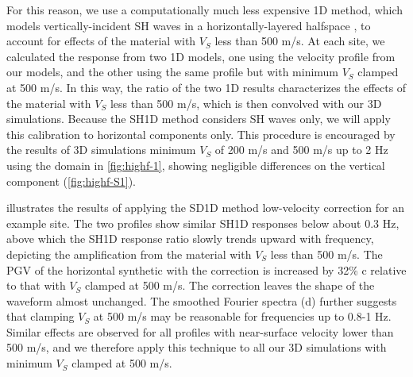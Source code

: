 For this reason, we use a computationally much less expensive 1D method, which models vertically-incident SH waves in a horizontally-layered halfspace , to account for effects of the material with $V_S$ less than 500 m/s. At each site, we calculated the response from two 1D models, one using the velocity profile from our models, and the other using the same profile but with minimum $V_S$ clamped at 500 m/s. In this way, the ratio of the two 1D results characterizes the effects of the material with $V_S$ less than 500 m/s, which is then convolved with our 3D simulations. Because the SH1D method considers SH waves only, we will apply this calibration to horizontal components only. This procedure is encouraged by the results of 3D simulations minimum $V_S$ of 200 m/s and 500 m/s up to 2 Hz using the domain in \cref{fig:highf-1}, showing negligible differences on the vertical component (\cref{fig:highf-S1}).

 illustrates the results of applying the SD1D method low-velocity correction for an example site. The two profiles show similar SH1D responses below about 0.3 Hz, above which the SH1D response ratio slowly trends upward with frequency, depicting the amplification from the material with $V_S$ less than 500 m/s. The PGV of the horizontal synthetic with the correction is increased by 32\% c relative to that with $V_S$ clamped at 500 m/s. The correction leaves the shape of the waveform almost unchanged. The smoothed Fourier spectra (d) further suggests that clamping $V_S$ at 500 m/s may be reasonable for frequencies up to 0.8-1 Hz. Similar effects are observed for all profiles with near-surface velocity lower than 500 m/s, and we therefore apply this technique to all our 3D simulations with minimum $V_S$ clamped at 500 m/s.


